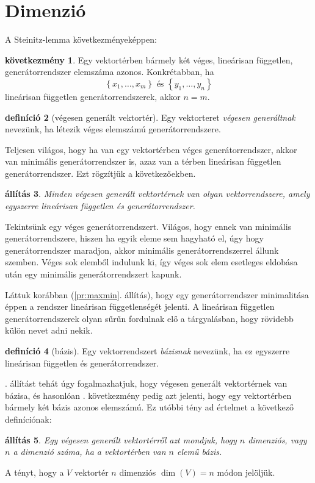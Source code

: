 \documentclass[9pt, a4paper, showtrims]{memoir}
\makeatletter
\let\Aref\relax
\renewenvironment{proof}[1][\proofname]
    {\par\pushQED{\qed}%
    \normalfont \topsep6\p@\@plus6\p@\relax
    \trivlist
    \item[\hskip\labelsep
        \itshape
    #1\@addpunct{:}]\ignorespaces}
    {\popQED\endtrivlist\@endpefalse}
\theoremstyle{plain}
\newtheorem{proposition}{állítás}[chapter]
\theoremstyle{remark}
\theoremstyle{definition}
\newtheorem{definition}[proposition]{definíció}
\newtheorem{corollary}[proposition]{következmény}
\makeatother
\begin{document}
\section{Dimenzió}
A Steinitz-lemma következményeképpen:
\begin{corollary}
	Egy vektortérben bármely két véges, lineárisan független, generátorrendszer elemszáma azonos.
	Konkrétabban, ha
	\[
		\left\{ x_1,\ldots,x_m \right\} \text{ és } \left\{ y_1,\ldots,y_n \right\}
	\]
	lineárisan független generátorrendszerek, akkor $n=m$.
	\label{co:baziselemszam}
\end{corollary}
\begin{definition}[végesen generált vektortér]
	Egy vektorteret \emph{végesen generáltnak} nevezünk,
	ha létezik véges elemszámú generátorrendszere.
\end{definition}
Teljesen világos, hogy ha van egy vektortérben véges generátorrendszer,
akkor van minimális generátorrendszer is, azaz van a térben lineárisan független generátorrendszer.
Ezt rögzítjük a következőekben.
\begin{proposition}
	Minden végesen generált vektortérnek van olyan vektorrendszere,
	amely egyszerre lineárisan független és generátorrendszer.
	\label{pr:bazisletezik}
\end{proposition}
\begin{proof}
	Tekintsünk egy véges generátorrendszert.
    Világos, hogy ennek van minimális generátorrendszere,
    hiszen ha egyik eleme sem hagyható el, úgy hogy generátorrendszer maradjon, akkor minimális
    generátorrendszerrel állunk szemben. 
    Véges sok elemből indulunk ki, 
    így véges sok elem esetleges eldobása után egy minimális generátorrendszert kapunk.

    Láttuk korábban (\ref{pr:maxmin}. állítás), hogy egy generátorrendszer minimalitása éppen a rendszer lineárisan függetlenségét jelenti.
\end{proof}
A lineárisan független generátorrendszerek olyan sűrűn fordulnak elő a tárgyalásban,
hogy rövidebb külön nevet adni nekik.
\begin{definition}[bázis]
	Egy vektorrendszert \emph{bázisnak} nevezünk, ha ez egyszerre lineárisan független és generátorrendszer.
\end{definition}
\Aref{pr:bazisletezik}. állítást tehát úgy fogalmazhatjuk, hogy végesen generált vektortérnek van bázisa,
és hasonlóan . következmény pedig azt jelenti,
hogy egy vektortérben bármely két bázis azonos elemszámú.
Ez utóbbi tény ad értelmet a következő definíciónak:
\begin{proposition}
	Egy végesen generált vektortérről azt mondjuk, hogy $n$ dimenziós, vagy $n$ a dimenzió száma,
	ha a vektortérben van $n$ elemű bázis.
\end{proposition}
A tényt, hogy a $V$ vektortér $n$ dimenziós $\dim\left( V \right)=n$ módon jelöljük.
\end{document}
